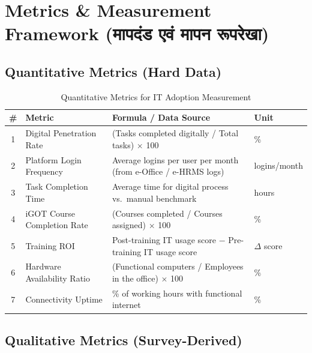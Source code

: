 \documentclass[12pt,a4paper]{article}
\newcommand{\hindi}[1]{{\hindifont #1}}
\begin{document}
\section{Metrics \& Measurement Framework (\hindi{मापदंड एवं मापन रूपरेखा})}

\subsection{Quantitative Metrics (Hard Data)}

\begin{table}[H]
\centering
\caption{Quantitative Metrics for IT Adoption Measurement}
\label{tab:metrics_quant}
\begin{tabularx}{\textwidth}{@{}clXl@{}}
\toprule
\textbf{\#} & \textbf{Metric} & \textbf{Formula / Data Source} & \textbf{Unit} \\
\midrule
1 & Digital Penetration Rate & (Tasks completed digitally / Total tasks) $\times$ 100 & \% \\
2 & Platform Login Frequency & Average logins per user per month (from e-Office / e-HRMS logs) & logins/month \\
3 & Task Completion Time & Average time for digital process vs.\ manual benchmark & hours \\
4 & iGOT Course Completion Rate & (Courses completed / Courses assigned) $\times$ 100 & \% \\
5 & Training ROI & Post-training IT usage score $-$ Pre-training IT usage score & $\Delta$ score \\
6 & Hardware Availability Ratio & (Functional computers / Employees in the office) $\times$ 100 & \% \\
7 & Connectivity Uptime & \% of working hours with functional internet & \% \\
\bottomrule
\end{tabularx}
\end{table}

\subsection{Qualitative Metrics (Survey-Derived)}
\end{document}
